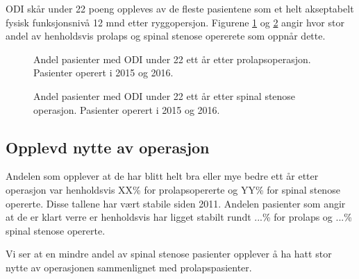 \documentclass [norsk,a4paper,twoside]{article}\usepackage[]{graphicx}\usepackage[]{color}
\begin{document}
\clearpage


ODI skår  under 22 poeng oppleves av de fleste pasientene som et helt akseptabelt fysisk funksjonsnivå 12 mnd etter ryggopersjon. Figurene \ref{fig:Osw22Pro} og \ref{fig:Osw22SS} angir hvor stor andel av henholdsvis prolaps og spinal stenose opererete som oppnår dette.

\begin{figure}[ht]
\caption{\label{fig:Osw22Pro}   Andel pasienter med ODI under 22 ett år
      etter prolapsoperasjon. Pasienter operert i 2015 og 2016.}
\end{figure}

\begin{figure}[ht]
\caption{\label{fig:Osw22SS}   Andel pasienter med ODI under 22 ett år
      etter spinal stenose operasjon. Pasienter operert i 2015 og 2016.}
\end{figure}



\subsection{Opplevd nytte av operasjon}

Andelen som opplever at de har blitt helt bra eller mye bedre ett år etter operasjon var  henholdsvis XX\% for prolapsopererte og YY\% for spinal stenose opererte. Disse tallene har vært stabile siden 2011. Andelen pasienter som angir at de er klart verre er henholdsvis har ligget stabilt rundt ...\% for prolaps og ...\% spinal stenose opererte.

Vi ser at en mindre andel av spinal stenose pasienter opplever å ha hatt stor nytte av operasjonen sammenlignet 
med prolapspasienter.
\end{document}
